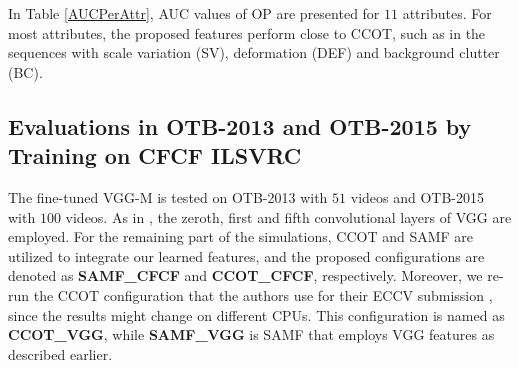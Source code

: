 \documentclass[journal]{IEEEtran}
\begin{document}
In Table \ref{AUCPerAttr}, AUC values of OP are presented for $11$ attributes. For most attributes, the proposed features perform close to CCOT, such as in the sequences with scale variation (SV), deformation (DEF) and background clutter (BC).
\begin{table}
\caption{\label{AUCPerAttr}\small AUC values for 11 attributes of the 40 sequences \cite{Benchmark2013}.}
\normalsize
{}
\end{table}
\subsection{Evaluations in OTB-2013 and OTB-2015 by Training on CFCF ILSVRC}
The fine-tuned VGG-M is tested on OTB-2013 with $51$ videos and OTB-2015 with $100$ videos. As in \cite{CCOT}, the zeroth, first and fifth convolutional layers of VGG are employed. For the remaining part of the simulations, CCOT \cite{CCOT} and SAMF \cite{SAMF} are utilized to integrate our learned features, and the proposed configurations are denoted as \textbf{SAMF\_CFCF} and \textbf{CCOT\_CFCF}, respectively. Moreover, we re-run the CCOT configuration that the authors use for their ECCV submission \cite{CCOT}, since the results might change on different CPUs. This configuration is named as \textbf{CCOT\_VGG}, while \textbf{SAMF\_VGG} is SAMF that employs VGG features as described earlier.
\end{document}

